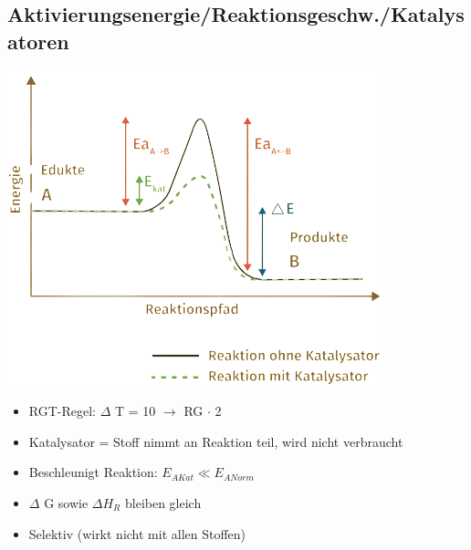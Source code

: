 \subsection{Aktivierungsenergie/Reaktionsgeschw./Katalysatoren}
\begin{minipage}{0.32\linewidth}
    \includegraphics[width=\linewidth]{pictures/Katalysator_1.png}
\end{minipage}
\hfill
\begin{minipage}{0.65\linewidth}
    \begin{itemize}
        \item RGT-Regel: $\Delta$ T = 10 $\rightarrow$ RG $\cdot$ 2
        \item Katalysator = Stoff nimmt an Reaktion teil, wird nicht verbraucht 
        \item Beschleunigt Reaktion: $E_{AKat} \ll E_{ANorm}$
        \item $\Delta$ G sowie $\Delta H_R$ bleiben gleich
        \item Selektiv (wirkt nicht mit allen Stoffen)
    \end{itemize}
\end{minipage}
